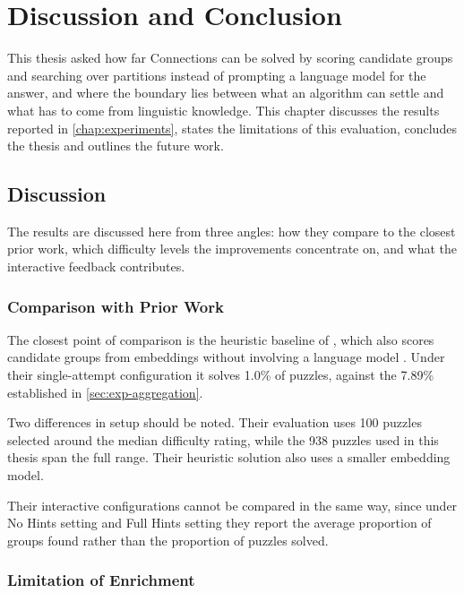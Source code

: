 \chapter{Discussion and Conclusion}
\label{chap:conclusion}

This thesis asked how far Connections can be solved by scoring candidate groups and searching over partitions instead of prompting a language model for the answer, and where the boundary lies between what an algorithm can settle and what has to come from linguistic knowledge. This chapter discusses the results reported in \autoref{chap:experiments}, states the limitations of this evaluation, concludes the thesis and outlines the future work.

\section{Discussion}
\label{sec:discussion}

The results are discussed here from three angles: how they compare to the closest prior work, which difficulty levels the improvements concentrate on, and what the interactive feedback contributes.

\subsection*{Comparison with Prior Work}

The closest point of comparison is the heuristic baseline of \citeauthor{loredolopezNYTConnectionsDeceptivelySimple2025}, which also scores candidate groups from embeddings without involving a language model \cite{loredolopezNYTConnectionsDeceptivelySimple2025}. Under their single-attempt configuration it solves 1.0\% of puzzles, against the 7.89\% established in \autoref{sec:exp-aggregation}.

Two differences in setup should be noted. Their evaluation uses 100 puzzles selected around the median difficulty rating, while the 938 puzzles used in this thesis span the full range. Their heuristic solution also uses a smaller embedding model.

Their interactive configurations cannot be compared in the same way, since under No Hints setting and Full Hints setting they report the average proportion of groups found rather than the proportion of puzzles solved.

\subsection*{Limitation of Enrichment}

